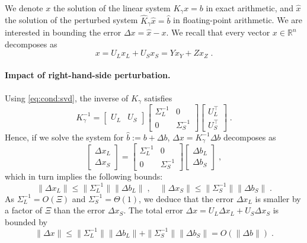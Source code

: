 We denote $x$ the solution of the linear system $K_\gamma x = b$
in exact arithmetic, and $\widehat{x}$ the solution of
the perturbed system $\widehat{K}_\gamma \widehat{x} = \widehat{b}$
in floating-point arithmetic. We are interested in bounding
the error $\Delta x = \widehat{x} - x$. We
recall that every vector $x \in \mathbb{R}^n$ decomposes as
\begin{equation}
  x = U_L x_L + U_S x_S = Y x_Y + Z x_Z \; .
\end{equation}

\paragraph{Impact of right-hand-side perturbation.}
Using \eqref{eq:cond:svd}, the inverse of
$K_\gamma$ satisfies
\begin{equation}
  \label{eq:cond:inversecondensed}
  K_\gamma^{-1}  = \begin{bmatrix} U_L & U_S \end{bmatrix}
  \begin{bmatrix}
    \Sigma_L^{-1} & 0 \\ 0 & \Sigma_S^{-1}
  \end{bmatrix}
  \begin{bmatrix}
    U_L^\top \\ U_S^\top
  \end{bmatrix}
  \; .
\end{equation}
Hence, if we solve the system for $\widehat{b} := b + \Delta b$,
$\Delta x = K_\gamma^{-1} \Delta b$ decomposes as
\begin{equation}
  \begin{bmatrix}
    \Delta x_L \\ \Delta x_S
  \end{bmatrix}
  =
  \begin{bmatrix}
    \Sigma_L^{-1} & 0 \\ 0 & \Sigma_S^{-1}
  \end{bmatrix}
  \begin{bmatrix}
    \Delta b_L \\ \Delta b_S
  \end{bmatrix}
  \; ,
\end{equation}
which in turn implies the following bounds:
\begin{equation}
  \label{eq:cond:rhserror}
     \| \Delta x_L \| \leq \| \Sigma_L^{-1} \| \| \Delta b_L \| \; ,\quad
    \| \Delta x_S \| \leq \| \Sigma_S^{-1} \| \| \Delta b_S \| \; .
\end{equation}
As $\Sigma_L^{-1} = O(\Xi)$ and $\Sigma_S^{-1} = \Theta(1)$,
we deduce that the error $\Delta x_L$ is smaller by a factor
of $\Xi$ than the error $\Delta x_S$. The total error
$\Delta x = U_L \Delta x_L + U_S \Delta x_S$ is bounded by
\begin{equation}
  \label{eq:cond:rhserrorfull}
  \| \Delta x \|
  \leq  \| \Sigma_L^{-1} \| \| \Delta b_L \| + \| \Sigma_S^{-1} \| \| \Delta b_S \| =
  O(\|\Delta b \|) \; .
\end{equation}

